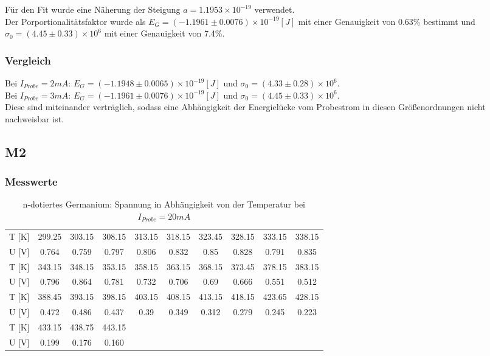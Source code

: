 Für den Fit wurde eine Näherung der Steigung  $a=1.1953\times 10^{-19}$ verwendet.\\
Der Porportionalitätsfaktor wurde als $E_{G}=(-1.1961 \pm 0.0076)\times 10^{-19} [J]$ mit einer Genauigkeit von 0.63\% bestimmt und $\sigma_{0}=(4.45 \pm 0.33)\times 10^{6}$ mit einer Genauigkeit von 7.4\%.\\

\subsubsection{Vergleich}

Bei $I_{Probe}=2mA$: $E_{G}=(-1.1948 \pm 0.0065)\times 10^{-19} [J]$ und $\sigma_{0}=(4.33 \pm 0.28)\times 10^{6}$.\\
Bei $I_{Probe}=3mA$: $E_{G}=(-1.1961 \pm 0.0076)\times 10^{-19} [J]$ und $\sigma_{0}=(4.45 \pm 0.33)\times 10^{6}$.\\
Diese sind miteinander verträglich, sodass eine Abhängigkeit der Energielücke vom Probestrom in diesen Größenordnungen nicht nachweisbar ist.

\subsection{M2}

\subsubsection{Messwerte}
\begin{table}[H]
\centering
\begin{tabular}{|c||c|c|c|c|c|c|c|c|c|}
\hline
T [K] & 299.25 & 303.15 & 308.15 & 313.15 & 318.15 & 323.45 & 328.15 & 333.15 & 338.15 \\
 U [V] & 0.764 & 0.759 & 0.797 & 0.806 & 0.832 & 0.85 & 0.828 & 0.791 & 0.835 \\
 \hline
 T [K] & 343.15 & 348.15 & 353.15 & 358.15 & 363.15 & 368.15 & 373.45 & 378.15 & 383.15 \\
 U [V] & 0.796 & 0.864 & 0.781 & 0.732 & 0.706 & 0.69 & 0.666 & 0.551 & 0.512 \\
 \hline
 T [K] & 388.45 & 393.15 & 398.15 & 403.15 & 408.15 & 413.15 & 418.15 & 423.65 & 428.15 \\
 U [V] & 0.472 & 0.486 & 0.437 & 0.39 & 0.349 & 0.312 & 0.279 & 0.245 & 0.223 \\
 \hline
 T [K]& 433.15 & 438.75 & 443.15 & & & & & & \\
U [V] & 0.199 & 0.176 & 0.160 & & & & & & \\
 \hline
\end{tabular}
\caption{n-dotiertes Germanium: Spannung in Abhängigkeit von der Temperatur bei $I_{Probe}=20mA$}
\end{table}  

